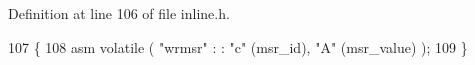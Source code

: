 Definition at line 106 of file inline.\+h.


\begin{DoxyCode}
107 \{
108     \textcolor{keyword}{asm} \textcolor{keyword}{volatile} ( \textcolor{stringliteral}{"wrmsr"} : : \textcolor{stringliteral}{"c"} (msr\_id), \textcolor{stringliteral}{"A"} (msr\_value) );
109 \}
\end{DoxyCode}
